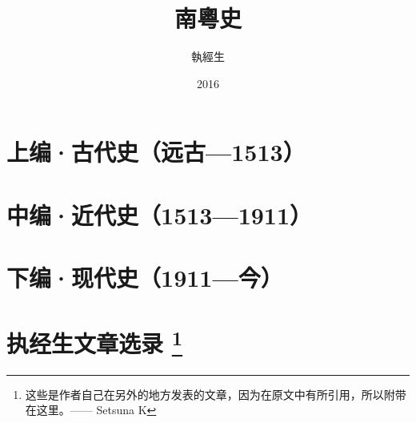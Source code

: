 \documentclass[a4paper,12pt]{memoir}
\date{}
\newcounter{daggerfootnote}
\newcommand*{\daggerfootnote}[1]{%
	\renewcommand*{\thefootnote}{\fnsymbol{footnote}}%
	\footnote[2]{#1}%
	\renewcommand*{\thefootnote}{\arabic{footnote}}%
}
\newcommand\blankpage{%
	\null
	\thispagestyle{empty}%
	\addtocounter{page}{-1}%
	\newpage}
\begin{document}
	
	\blankpage
	

	\author{執經生}
	\title{南粵史}
	\date{2016}
	\maketitle
	
	
	
	
	\tableofcontents
	
	\mainmatter
	\part{上编·古代史（远古—1513） }
	
	
	
	
	
	
	
	
	
	
	
	
	
	
	
	
	
	
	\part{中编·近代史（1513—1911）}
	
	
	
	
	
	
	
	
	
	
	
	
	
	
	
	
	
	
	
	\part{下编·现代史（1911—今）}
	
	
	
	
	
	
	
	
	
	\appendix
	
	
	
	
	\part[执经生文章选录]{执经生文章选录\protect\daggerfootnote{这些是作者自己在另外的地方发表的文章，因为在原文中有所引用，所以附带在这里。—— Setsuna K}}
	
	
	
	\backmatter
	
\end{document}
